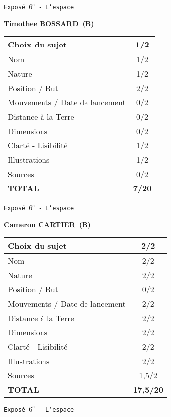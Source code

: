 	\LARGE{\texttt{Expos\'e $6^e$ - L'espace}}
	\vspace*{1cm}

	\textbf{Timothee BOSSARD\ (B)}

	\vspace*{2cm}
	\begin{tabular}{|l|c|}
		\hline
		Choix du sujet & 1/2 \\
		\hline
		Nom & 1/2 \\
		\hline
		Nature & 1/2 \\
		\hline
		Position / But & 2/2 \\
		\hline
		Mouvements / Date de lancement & 0/2 \\
		\hline
		Distance \`a la Terre & 0/2 \\
		\hline
		Dimensions & 0/2 \\
		\hline
		Clart\'e - Lisibilit\'e & 1/2 \\
		\hline
		Illustrations & 1/2 \\
		\hline
		Sources & 0/2 \\
		\hline
		\textbf{TOTAL}  & \textbf{7/20} \\
		\hline
	\end{tabular}
	\newline
	\LARGE{\texttt{Expos\'e $6^e$ - L'espace}}
	\vspace*{1cm}

	\textbf{Cameron CARTIER\ (B)}

	\vspace*{2cm}
	\begin{tabular}{|l|c|}
		\hline
		Choix du sujet & 2/2 \\
		\hline
		Nom & 2/2 \\
		\hline
		Nature & 2/2 \\
		\hline
		Position / But & 0/2 \\
		\hline
		Mouvements / Date de lancement & 2/2 \\
		\hline
		Distance \`a la Terre & 2/2 \\
		\hline
		Dimensions & 2/2 \\
		\hline
		Clart\'e - Lisibilit\'e & 2/2 \\
		\hline
		Illustrations & 2/2 \\
		\hline
		Sources & 1,5/2 \\
		\hline
		\textbf{TOTAL}  & \textbf{17,5/20} \\
		\hline
	\end{tabular}
	\newline
	\LARGE{\texttt{Expos\'e $6^e$ - L'espace}}
	\vspace*{1cm}

